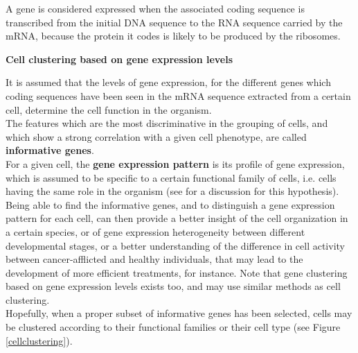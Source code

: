 \documentclass{report}
\begin{document}

A gene is considered expressed when the associated coding sequence is transcribed from the initial DNA sequence to the RNA sequence carried by the mRNA, because the protein it codes is likely to be produced by the ribosomes. 

\bigskip
\noindent \textbf{Cell clustering based on gene expression levels}
\bigskip

It is assumed that the levels of gene expression, for the different genes which coding sequences have been seen in the mRNA sequence extracted from a certain cell, determine the cell function in the organism.\\

The features which are the most discriminative in the grouping of cells, and which show a strong correlation with a given cell phenotype, are called \textbf{informative genes}\cite{liu2006efficient}.\\

For a given cell, the \textbf{gene expression pattern} is its profile of gene expression, which is assumed to be specific to a certain functional family of cells, i.e. cells having the same role in the organism (see \cite{barash2002context} for a discussion for this hypothesis).\\

Being able to find the informative genes, and to distinguish a gene expression pattern for each cell, can then provide a better insight of the cell organization in a certain species\cite{tintori2016transcriptional}, or of gene expression heterogeneity between different developmental stages\cite{goolam2016heterogeneity}, or a better understanding of the difference in cell activity between cancer-afflicted and healthy individuals\cite{ting2014single}, that may lead to the development of more efficient treatments, for instance.  Note that gene clustering based on gene expression levels exists too, and may use similar methods as cell clustering\cite{d2005does}\cite{jiang2004cluster}.\\

Hopefully, when a proper subset of informative genes has been selected, cells may be clustered according to their functional families or their cell type (see Figure \ref{cellclustering}). 
\end{document}
